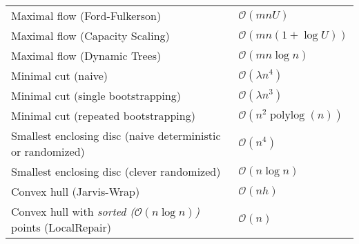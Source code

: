 \documentclass[a4paper,10pt]{article}
\newcommand{\bigO}{\mathcal{O}}
\DeclareMathOperator{\polylog}{polylog}
\begin{document}
\begin{center}
\begin{tabularx}{\textwidth}{Xl}
        Maximal flow (Ford-Fulkerson) & \(\bigO(mnU)\)\\
        Maximal flow (Capacity Scaling) & \(\bigO(mn(1 + \log U))\) \\
        Maximal flow (Dynamic Trees) & \(\bigO(mn\log n)\) \\
        Minimal cut (naive) & \(\bigO(\lambda n^4)\) \\
        Minimal cut (single bootstrapping) & \(\bigO(\lambda n^3)\) \\
        Minimal cut (repeated bootstrapping) & \(\bigO(n^2\polylog(n))\) \\
        Smallest enclosing disc (naive deterministic or randomized) & \(\bigO(n^4)\)\footnotemark[\value{footnote}] \\
        Smallest enclosing disc (clever randomized) & \(\bigO(n \log n)\)\footnotemark[\value{footnote}] \\
        Convex hull (Jarvis-Wrap) & \(\bigO(nh)\) \\
        Convex hull with \emph{sorted ($\bigO(n \log n)$)} points (LocalRepair) & \(\bigO(n)\) \\
        \bottomrule
    \end{tabularx}
    \end{center}
\end{document}
